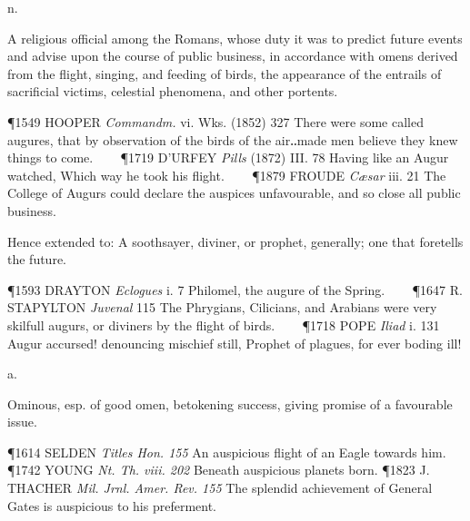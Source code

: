 \begin{description}[wide, labelwidth=!, labelindent=0pt]
 n.

\noindent {}

\vspace{-0.3cm}

\begin{myenumerate}

 A religious official among the Romans, whose duty it was to predict future events and advise upon the course of public business, in accordance with omens derived from the flight, singing, and feeding of birds, the appearance of the entrails of sacrificial victims, celestial phenomena, and other portents.

\P 1549 HOOPER  \textit{Commandm.} vi. Wks. (1852) 327 There were some called augures, that by observation of the birds of the air‥made men believe they knew things to come.    
\P 1719 D'URFEY  \textit{Pills} (1872) III. 78 Having like an Augur watched, Which way he took his flight.    
\P 1879 FROUDE  \textit{Cæsar} iii. 21 The College of Augurs could declare the auspices unfavourable, and so close all public business.

 Hence extended to: A soothsayer, diviner, or prophet, generally; one that foretells the future.

\P 1593 DRAYTON  \textit{Eclogues} i. 7 Philomel, the augure of the Spring.    
\P 1647 R. STAPYLTON  \textit{Juvenal} 115 The Phrygians, Cilicians, and Arabians were very skilfull augurs, or diviners by the flight of birds.    
\P 1718 POPE  \textit{Iliad} i. 131 Augur accursed! denouncing mischief still, Prophet of plagues, for ever boding ill!
\end{myenumerate}


 a.

\vspace{-0.3cm}

\begin{myenumerate}
 Ominous, esp. of good omen, betokening success, giving promise of a
favourable issue.  

\P 1614 SELDEN \textit{Titles Hon. 155} An auspicious flight of an Eagle towards him.
\P 1742 YOUNG \textit{Nt. Th. viii. 202} Beneath auspicious planets born. 
\P 1823 J. THACHER \textit{Mil. Jrnl. Amer. Rev. 155} The splendid achievement 
of General Gates is auspicious to his preferment.


\end{myenumerate}
\end{description}
